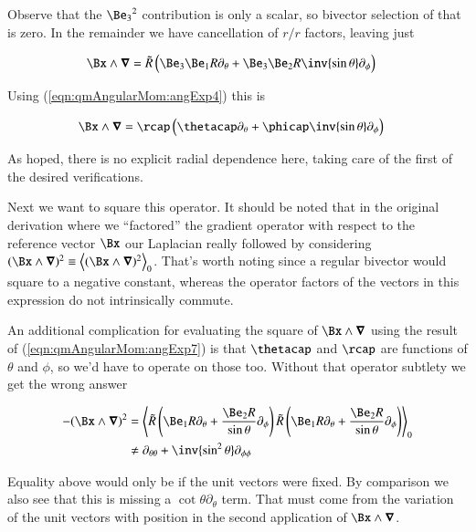 Observe that the ${\Be_3}^2$ contribution is only a scalar, so bivector selection of that is zero.  In the remainder we have cancellation of $r/r$ factors, leaving just

\begin{align}\label{eqn:qmAngularMom:angExp6}
\Bx \wedge \spacegrad 
&=
\tilde{R} \left( \Be_3 \Be_1 R \partial_\theta + \Be_3 \Be_2 R \inv{\sin\theta} \partial_\phi \right) 
\end{align}

Using (\ref{eqn:qmAngularMom:angExp4}) this is

\begin{align}\label{eqn:qmAngularMom:angExp7}
\Bx \wedge \spacegrad 
&=
\rcap \left( \thetacap \partial_\theta + \phicap \inv{\sin\theta} \partial_\phi \right) 
\end{align}

As hoped, there is no explicit radial dependence here, taking care of the first of the desired verifications.

Next we want to square this operator.  It should be noted that in the original derivation where we ``factored'' the gradient operator with respect to the reference vector $\Bx$ our Laplacian really followed by considering $(\Bx \wedge \spacegrad)^2 \equiv \gpgradezero{(\Bx \wedge \spacegrad)^2}$.  That's worth noting since a regular bivector would square to a negative constant, whereas the operator factors of the vectors in this expression do not intrinsically commute.

An additional complication for evaluating the square of $\Bx \wedge \spacegrad$ using the result of (\ref{eqn:qmAngularMom:angExp7}) is that $\thetacap$ and $\rcap$ are functions of $\theta$ and $\phi$, so we'd have to operate on those too.  Without that operator subtlety we get the wrong answer

\begin{align*}
-(\Bx \wedge \spacegrad)^2
&=
\gpgradezero{ 
\tilde{R} \left( \Be_1 R \partial_\theta + \frac{\Be_2 R}{\sin\theta}\partial_\phi \right)
\tilde{R} \left( \Be_1 R \partial_\theta + \frac{\Be_2 R}{\sin\theta}\partial_\phi \right)
 } \\
&\ne
\partial_{\theta\theta} + \inv{\sin^2\theta} \partial_{\phi\phi}
\end{align*}

Equality above would only be if the unit vectors were fixed.  By comparison we also see that this is missing a $\cot\theta \partial_\theta$ term.  That must come from the variation of the unit vectors with position in the second application of $\Bx \wedge \spacegrad$.

